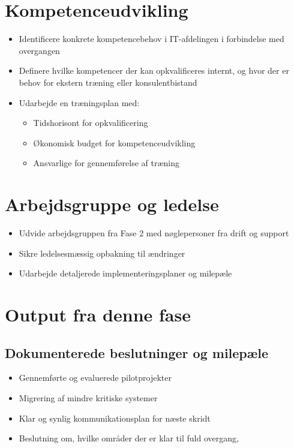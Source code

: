 \documentclass[a4paper,11pt]{book}
\begin{document}
\section{Kompetenceudvikling}\label{kompetenceudvikling}

\begin{itemize}
\item
  Identificere konkrete kompetencebehov i IT-afdelingen i forbindelse
  med overgangen
\item
  Definere hvilke kompetencer der kan opkvalificeres internt, og hvor
  der er behov for ekstern træning eller konsulentbistand
\item
  Udarbejde en træningsplan med:

  \begin{itemize}
  \tightlist
  \item
    Tidshorisont for opkvalificering
  \item
    Økonomisk budget for kompetenceudvikling
  \item
    Ansvarlige for gennemførelse af træning
  \end{itemize}
\end{itemize}

\section{Arbejdsgruppe og ledelse}\label{arbejdsgruppe-og-ledelse}

\begin{itemize}
\tightlist
\item
  Udvide arbejdsgruppen fra Fase 2 med nøglepersoner fra drift og
  support
\item
  Sikre ledelsesmæssig opbakning til ændringer
\item
  Udarbejde detaljerede implementeringsplaner og milepæle
\end{itemize}

\section{Output fra denne fase}\label{output-fra-denne-fase}

\subsection{Dokumenterede beslutninger og
milepæle}\label{dokumenterede-beslutninger-og-milepuxe6le}

\begin{itemize}
\tightlist
\item
  Gennemførte og evaluerede pilotprojekter
\item
  Migrering af mindre kritiske systemer
\item
  Klar og synlig kommunikationsplan for næste skridt
\item
  Beslutning om, hvilke områder der er klar til fuld overgang,
\end{itemize}
\end{document}
